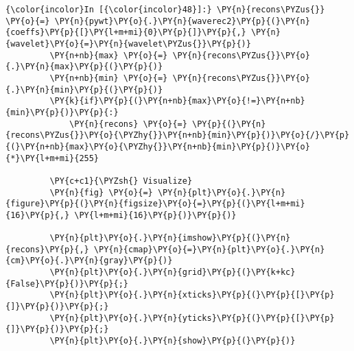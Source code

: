     \begin{Verbatim}[commandchars=\\\{\}]
{\color{incolor}In [{\color{incolor}48}]:} \PY{n}{recons\PYZus{}} \PY{o}{=} \PY{n}{pywt}\PY{o}{.}\PY{n}{waverec2}\PY{p}{(}\PY{n}{coeffs}\PY{p}{[}\PY{l+m+mi}{0}\PY{p}{]}\PY{p}{,} \PY{n}{wavelet}\PY{o}{=}\PY{n}{wavelet\PYZus{}}\PY{p}{)}
         \PY{n+nb}{max} \PY{o}{=} \PY{n}{recons\PYZus{}}\PY{o}{.}\PY{n}{max}\PY{p}{(}\PY{p}{)}
         \PY{n+nb}{min} \PY{o}{=} \PY{n}{recons\PYZus{}}\PY{o}{.}\PY{n}{min}\PY{p}{(}\PY{p}{)}
         \PY{k}{if}\PY{p}{(}\PY{n+nb}{max}\PY{o}{!=}\PY{n+nb}{min}\PY{p}{)}\PY{p}{:}
             \PY{n}{recons} \PY{o}{=} \PY{p}{(}\PY{n}{recons\PYZus{}}\PY{o}{\PYZhy{}}\PY{n+nb}{min}\PY{p}{)}\PY{o}{/}\PY{p}{(}\PY{n+nb}{max}\PY{o}{\PYZhy{}}\PY{n+nb}{min}\PY{p}{)}\PY{o}{*}\PY{l+m+mi}{255}
         
         \PY{c+c1}{\PYZsh{} Visualize}
         \PY{n}{fig} \PY{o}{=} \PY{n}{plt}\PY{o}{.}\PY{n}{figure}\PY{p}{(}\PY{n}{figsize}\PY{o}{=}\PY{p}{(}\PY{l+m+mi}{16}\PY{p}{,} \PY{l+m+mi}{16}\PY{p}{)}\PY{p}{)}
         
         \PY{n}{plt}\PY{o}{.}\PY{n}{imshow}\PY{p}{(}\PY{n}{recons}\PY{p}{,} \PY{n}{cmap}\PY{o}{=}\PY{n}{plt}\PY{o}{.}\PY{n}{cm}\PY{o}{.}\PY{n}{gray}\PY{p}{)}
         \PY{n}{plt}\PY{o}{.}\PY{n}{grid}\PY{p}{(}\PY{k+kc}{False}\PY{p}{)}\PY{p}{;}
         \PY{n}{plt}\PY{o}{.}\PY{n}{xticks}\PY{p}{(}\PY{p}{[}\PY{p}{]}\PY{p}{)}\PY{p}{;}
         \PY{n}{plt}\PY{o}{.}\PY{n}{yticks}\PY{p}{(}\PY{p}{[}\PY{p}{]}\PY{p}{)}\PY{p}{;}
         \PY{n}{plt}\PY{o}{.}\PY{n}{show}\PY{p}{(}\PY{p}{)}
\end{Verbatim}


    \begin{center}
    \end{center}
    { \hspace*{\fill} \\}
    
